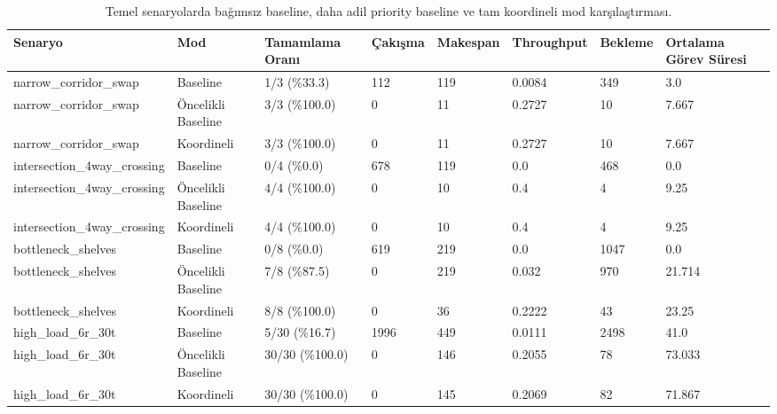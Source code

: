 \begin{table}[t]
\centering
\small
\begin{tabular}{llllllll}
\hline
Senaryo & Mod & Tamamlama Oranı & Çakışma & Makespan & Throughput & Bekleme & Ortalama Görev Süresi \\
\hline
narrow\_corridor\_swap & Baseline & 1/3 (\%33.3) & 112 & 119 & 0.0084 & 349 & 3.0 \\
narrow\_corridor\_swap & Öncelikli Baseline & 3/3 (\%100.0) & 0 & 11 & 0.2727 & 10 & 7.667 \\
narrow\_corridor\_swap & Koordineli & 3/3 (\%100.0) & 0 & 11 & 0.2727 & 10 & 7.667 \\
intersection\_4way\_crossing & Baseline & 0/4 (\%0.0) & 678 & 119 & 0.0 & 468 & 0.0 \\
intersection\_4way\_crossing & Öncelikli Baseline & 4/4 (\%100.0) & 0 & 10 & 0.4 & 4 & 9.25 \\
intersection\_4way\_crossing & Koordineli & 4/4 (\%100.0) & 0 & 10 & 0.4 & 4 & 9.25 \\
bottleneck\_shelves & Baseline & 0/8 (\%0.0) & 619 & 219 & 0.0 & 1047 & 0.0 \\
bottleneck\_shelves & Öncelikli Baseline & 7/8 (\%87.5) & 0 & 219 & 0.032 & 970 & 21.714 \\
bottleneck\_shelves & Koordineli & 8/8 (\%100.0) & 0 & 36 & 0.2222 & 43 & 23.25 \\
high\_load\_6r\_30t & Baseline & 5/30 (\%16.7) & 1996 & 449 & 0.0111 & 2498 & 41.0 \\
high\_load\_6r\_30t & Öncelikli Baseline & 30/30 (\%100.0) & 0 & 146 & 0.2055 & 78 & 73.033 \\
high\_load\_6r\_30t & Koordineli & 30/30 (\%100.0) & 0 & 145 & 0.2069 & 82 & 71.867 \\
\hline
\end{tabular}
\caption{Temel senaryolarda bağımsız baseline, daha adil priority baseline ve tam koordineli mod karşılaştırması.}
\label{tab:main_comparison}
\end{table}
